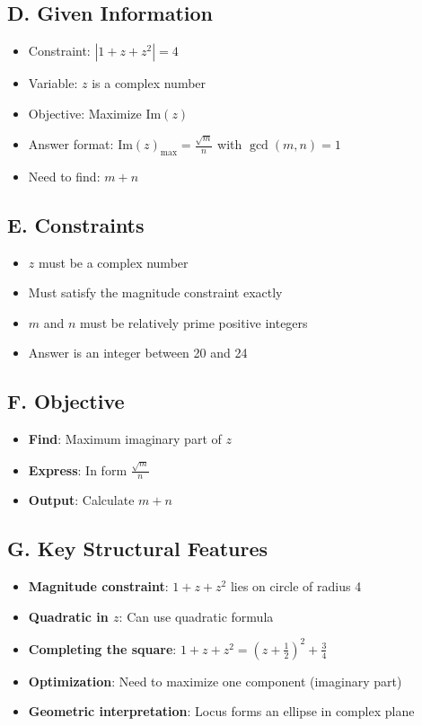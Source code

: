 \documentclass[11pt]{article}
\begin{document}
\begin{problembox}
\subsection*{D. Given Information}
\begin{itemize}[leftmargin=*]
    \item Constraint: $|1+z+z^2| = 4$
    \item Variable: $z$ is a complex number
    \item Objective: Maximize $\text{Im}(z)$
    \item Answer format: $\text{Im}(z)_{\text{max}} = \frac{\sqrt{m}}{n}$ with $\gcd(m,n) = 1$
    \item Need to find: $m + n$
\end{itemize}

\subsection*{E. Constraints}
\begin{itemize}[leftmargin=*]
    \item $z$ must be a complex number
    \item Must satisfy the magnitude constraint exactly
    \item $m$ and $n$ must be relatively prime positive integers
    \item Answer is an integer between 20 and 24
\end{itemize}

\subsection*{F. Objective}
\begin{itemize}[leftmargin=*]
    \item \textbf{Find}: Maximum imaginary part of $z$
    \item \textbf{Express}: In form $\frac{\sqrt{m}}{n}$
    \item \textbf{Output}: Calculate $m + n$
\end{itemize}

\subsection*{G. Key Structural Features}
\begin{itemize}[leftmargin=*]
    \item \textbf{Magnitude constraint}: $1+z+z^2$ lies on circle of radius 4
    \item \textbf{Quadratic in $z$}: Can use quadratic formula
    \item \textbf{Completing the square}: $1+z+z^2 = (z+\frac{1}{2})^2 + \frac{3}{4}$
    \item \textbf{Optimization}: Need to maximize one component (imaginary part)
    \item \textbf{Geometric interpretation}: Locus forms an ellipse in complex plane
\end{itemize}


\end{problembox}
\end{document}
